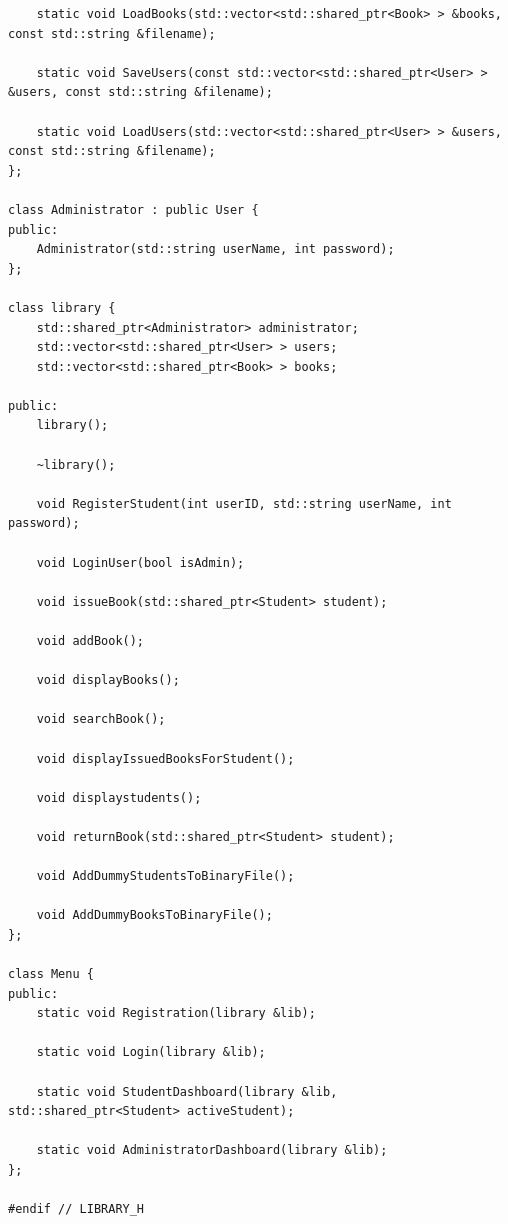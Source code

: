 \documentclass[12pt,a4paper]{report}
\begin{document}
\begin{verbatim}
    static void LoadBooks(std::vector<std::shared_ptr<Book> > &books, const std::string &filename);

    static void SaveUsers(const std::vector<std::shared_ptr<User> > &users, const std::string &filename);

    static void LoadUsers(std::vector<std::shared_ptr<User> > &users, const std::string &filename);
};

class Administrator : public User {
public:
    Administrator(std::string userName, int password);
};

class library {
    std::shared_ptr<Administrator> administrator;
    std::vector<std::shared_ptr<User> > users;
    std::vector<std::shared_ptr<Book> > books;

public:
    library();

    ~library();

    void RegisterStudent(int userID, std::string userName, int password);

    void LoginUser(bool isAdmin);

    void issueBook(std::shared_ptr<Student> student);

    void addBook();

    void displayBooks();

    void searchBook();

    void displayIssuedBooksForStudent();

    void displaystudents();

    void returnBook(std::shared_ptr<Student> student);

    void AddDummyStudentsToBinaryFile();

    void AddDummyBooksToBinaryFile();
};

class Menu {
public:
    static void Registration(library &lib);

    static void Login(library &lib);

    static void StudentDashboard(library &lib, std::shared_ptr<Student> activeStudent);

    static void AdministratorDashboard(library &lib);
};

#endif // LIBRARY_H

\end{verbatim}
\end{document}
